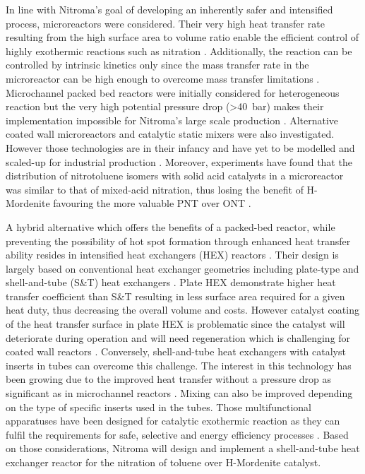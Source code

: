 In line with Nitroma's goal of developing an inherently safer and intensified process, microreactors were considered. Their very high heat transfer rate resulting from the high surface area to volume ratio enable the efficient control of highly exothermic reactions such as nitration \cite{halder_nitration_2007}. Additionally, the reaction can be controlled by intrinsic kinetics only since the mass transfer rate in the microreactor can be high enough to overcome mass transfer limitations \cite{halder_nitration_2007}. Microchannel packed bed reactors were initially considered for heterogeneous reaction but the very high potential pressure drop (\SI{>40}{\bar}) makes their implementation impossible for Nitroma's large scale production \cite{rebrov_microreactors_2016}. Alternative coated wall microreactors and catalytic static mixers were also investigated. However those technologies are in their infancy and have yet to be modelled and scaled-up for industrial production \cite{lopes_regime_2013}. Moreover, experiments have found that the distribution of nitrotoluene isomers with solid acid catalysts in a microreactor was similar to that of mixed-acid nitration, thus losing the benefit of H-Mordenite favouring the more valuable PNT over ONT \cite{halder_nitration_2007}.


A hybrid alternative which offers the benefits of a packed-bed reactor, while preventing the possibility of hot spot formation through enhanced heat transfer ability resides in intensified heat exchangers (HEX) reactors \cite{di_miceli_raimondi_safety_2015}. Their design is largely based on conventional heat exchanger geometries including plate-type and shell-and-tube (S\&T) heat exchangers \cite{anxionnaz_heat_2008}. Plate HEX demonstrate higher heat transfer coefficient than S\&T resulting in less surface area required for a given heat duty, thus decreasing the overall volume and costs. However catalyst coating of the heat transfer surface in plate HEX is problematic since the catalyst will deteriorate during operation and will need regeneration which is challenging for coated wall reactors \cite{anxionnaz_heat_2008}. Conversely, shell-and-tube heat exchangers with catalyst inserts in tubes can overcome this challenge. The interest in this technology has been growing due to the improved heat transfer without a pressure drop as significant as in microchannel reactors \cite{griffin_heat_2001}. Mixing can also be improved depending on the type of specific inserts used in the tubes. Those multifunctional apparatuses have been designed for catalytic exothermic reaction as they can fulfil the requirements for safe, selective and energy efficiency processes \cite{anxionnaz_heat_2008}. Based on those considerations, Nitroma will design and implement a shell-and-tube heat exchanger reactor for the nitration of toluene over H-Mordenite catalyst.

